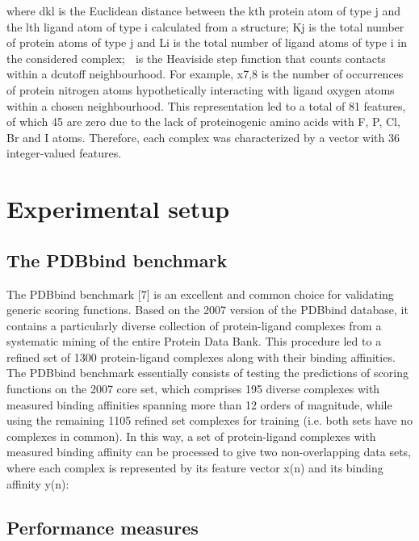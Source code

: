 \documentclass{llncs}
\begin{document}

where dkl is the Euclidean distance between the kth protein atom of type j and the lth ligand atom of type i calculated from a structure; Kj is the total number of protein atoms of type j and Li is the total number of ligand atoms of type i in the considered complex;  is the Heaviside step function that counts contacts within a dcutoff neighbourhood. For example, x7,8 is the number of occurrences of protein nitrogen atoms hypothetically interacting with ligand oxygen atoms within a chosen neighbourhood. This representation led to a total of 81 features, of which 45 are zero due to the lack of proteinogenic amino acids with F, P, Cl, Br and I atoms. Therefore, each complex was characterized by a vector with 36 integer-valued features.

\section{Experimental setup}

\subsection{The PDBbind benchmark}


The PDBbind benchmark [7] is an excellent and common choice for validating generic scoring functions. Based on the 2007 version of the PDBbind database, it contains a particularly diverse collection of protein-ligand complexes from a systematic mining of the entire Protein Data Bank. This procedure led to a refined set of 1300 protein-ligand complexes along with their binding affinities. The PDBbind benchmark essentially consists of testing the predictions of scoring functions on the 2007 core set, which comprises 195 diverse complexes with measured binding affinities spanning more than 12 orders of magnitude, while using the remaining 1105 refined set complexes for training (i.e. both sets have no complexes in common). In this way, a set of protein-ligand complexes with measured binding affinity can be processed to give two non-overlapping data sets, where each complex is represented by its feature vector x(n) and its binding affinity y(n):


\subsection{Performance measures}
\end{document}
